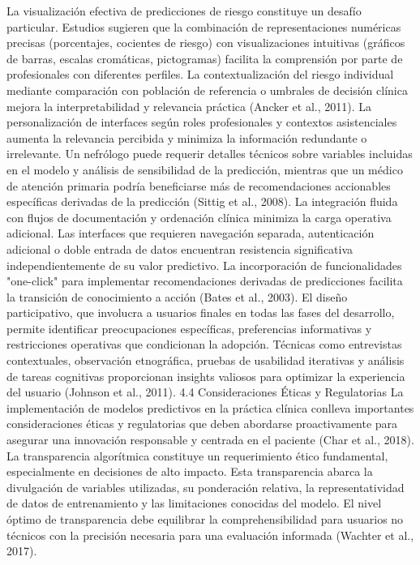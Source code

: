 \documentclass{article}
\begin{document}
\begin{multicols}{2}
La visualización efectiva de predicciones de riesgo constituye un desafío particular. Estudios sugieren que la combinación de representaciones numéricas precisas (porcentajes, cocientes de riesgo) con visualizaciones intuitivas (gráficos de barras, escalas cromáticas, pictogramas) facilita la comprensión por parte de profesionales con diferentes perfiles. La contextualización del riesgo individual mediante comparación con población de referencia o umbrales de decisión clínica mejora la interpretabilidad y relevancia práctica (Ancker et al., 2011).
La personalización de interfaces según roles profesionales y contextos asistenciales aumenta la relevancia percibida y minimiza la información redundante o irrelevante. Un nefrólogo puede requerir detalles técnicos sobre variables incluidas en el modelo y análisis de sensibilidad de la predicción, mientras que un médico de atención primaria podría beneficiarse más de recomendaciones accionables específicas derivadas de la predicción (Sittig et al., 2008).
La integración fluida con flujos de documentación y ordenación clínica minimiza la carga operativa adicional. Las interfaces que requieren navegación separada, autenticación adicional o doble entrada de datos encuentran resistencia significativa independientemente de su valor predictivo. La incorporación de funcionalidades "one-click" para implementar recomendaciones derivadas de predicciones facilita la transición de conocimiento a acción (Bates et al., 2003).
El diseño participativo, que involucra a usuarios finales en todas las fases del desarrollo, permite identificar preocupaciones específicas, preferencias informativas y restricciones operativas que condicionan la adopción. Técnicas como entrevistas contextuales, observación etnográfica, pruebas de usabilidad iterativas y análisis de tareas cognitivas proporcionan insights valiosos para optimizar la experiencia del usuario (Johnson et al., 2011).
 4.4 Consideraciones Éticas y Regulatorias
La implementación de modelos predictivos en la práctica clínica conlleva importantes consideraciones éticas y regulatorias que deben abordarse proactivamente para asegurar una innovación responsable y centrada en el paciente (Char et al., 2018).
La transparencia algorítmica constituye un requerimiento ético fundamental, especialmente en decisiones de alto impacto. Esta transparencia abarca la divulgación de variables utilizadas, su ponderación relativa, la representatividad de datos de entrenamiento y las limitaciones conocidas del modelo. El nivel óptimo de transparencia debe equilibrar la comprehensibilidad para usuarios no técnicos con la precisión necesaria para una evaluación informada (Wachter et al., 2017).

\end{multicols}
\end{document}
